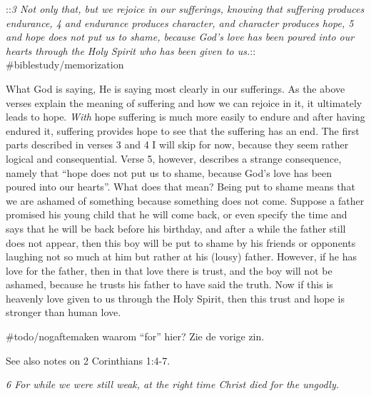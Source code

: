 ::\emph{3 Not only that, but we rejoice in our sufferings, knowing that
suffering produces endurance, 4 and endurance produces character, and
character produces hope, 5 and hope does not put us to shame, because
God's love has been poured into our hearts through the Holy Spirit who
has been given to us.}:: \#biblestudy/memorization

What God is saying, He is saying most clearly in our sufferings. As the
above verses explain the meaning of suffering and how we can rejoice in
it, it ultimately leads to hope. \emph{With} hope suffering is much more
easily to endure and after having endured it, suffering provides hope to
see that the suffering has an end. The first parts described in verses 3
and 4 I will skip for now, because they seem rather logical and
consequential. Verse 5, however, describes a strange consequence, namely
that ``hope does not put us to shame, because God's love has been poured
into our hearts''. What does that mean? Being put to shame means that we
are ashamed of something because something does not come. Suppose a
father promised his young child that he will come back, or even specify
the time and says that he will be back before his birthday, and after a
while the father still does not appear, then this boy will be put to
shame by his friends or opponents laughing not so much at him but rather
at his (lousy) father. However, if he has love for the father, then in
that love there is trust, and the boy will not be ashamed, because he
trusts his father to have said the truth. Now if this is heavenly love
given to us through the Holy Spirit, then this trust and hope is
stronger than human love.

\#todo/nogaftemaken waarom ``for'' hier? Zie de vorige zin.

See also notes on 2 Corinthians 1:4-7.

\emph{6 For while we were still weak, at the right time Christ died for
the ungodly.}

